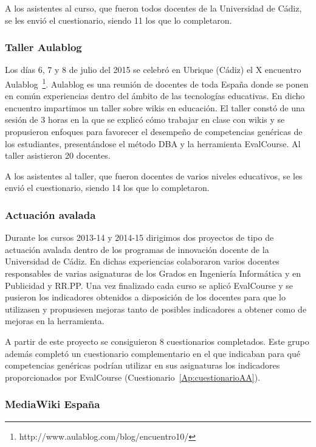 A los asistentes al curso, que fueron todos docentes de la Universidad de Cádiz, se les envió el cuestionario, siendo 11 los que lo completaron.

	\subsubsection{Taller Aulablog}

		Los días 6, 7 y 8 de julio del 2015 se celebró en Ubrique (Cádiz) el X encuentro Aulablog~\footnote{http://www.aulablog.com/blog/encuentro10/}. Aulablog es una reunión de docentes de toda España donde se ponen en común experiencias  dentro del ámbito de las tecnologías educativas. En dicho encuentro impartimos un taller sobre wikis en educación. El taller constó de una sesión de 3 horas en la que se explicó cómo trabajar en clase con wikis y se propusieron enfoques para favorecer el desempeño de competencias genéricas de los estudiantes, presentándose el método DBA y la herramienta EvalCourse. Al taller asistieron 20 docentes.

A los asistentes al taller, que fueron docentes de varios niveles educativos, se les envió el cuestionario, siendo 14 los que lo completaron.

	\subsubsection{Actuación avalada}

		Durante los cursos 2013-14 y 2014-15 dirigimos dos proyectos de tipo de actuación avalada dentro de los programas de innovación docente de la Universidad de Cádiz. En dichas experiencias colaboraron varios docentes responsables de varias asignaturas de los Grados en Ingeniería Informática y en Publicidad y RR.PP. Una vez finalizado cada curso se aplicó EvalCourse y se pusieron los indicadores obtenidos a disposición de los docentes para que lo utilizasen y propusiesen mejoras tanto de posibles indicadores a obtener como de mejoras en la herramienta.

A partir de este proyecto se consiguieron 8 cuestionarios completados. Este grupo además completó un cuestionario complementario en el que indicaban para qué competencias genéricas podrían utilizar en sus asignaturas los indicadores proporcionados por EvalCourse (Cuestionario~\ref{Ap:cuestionarioAA}).

	\subsubsection{MediaWiki España}

